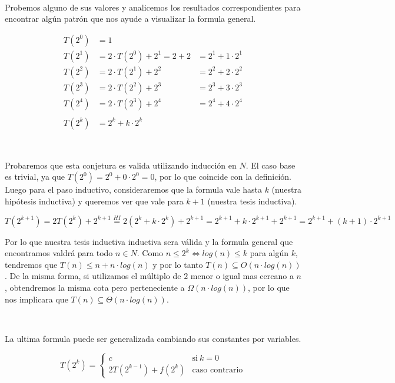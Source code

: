 \documentclass[10pt, a4paper]{report}
\begin{document}
~

Probemos alguno de sus valores y analicemos los resultados correspondientes para encontrar alg\'un patr\'on que nos ayude a visualizar la formula general.

\begin{equation*}
\begin{align*}
 T(2^0) & = 1 \\
 T(2^1) & = 2 \cdot T(2^0) + 2^1 = 2 + 2 & = 2^1 + 1 \cdot 2^1 \\
 T(2^2) & = 2 \cdot T(2^1) + 2^2 & = 2^2 + 2 \cdot 2^2 \\
 T(2^3) & = 2 \cdot T(2^2) + 2^3 &= 2^3 + 3 \cdot 2^3 \\
 T(2^4) & = 2 \cdot T(2^3) + 2^4 &= 2^4 + 4 \cdot 2^4 \\ \\
 T(2^k) & = 2^k + k \cdot 2^k
\end{align*}
\end{equation*}

~

Probaremos que esta conjetura es valida utilizando inducci\'on en $N$. El caso base es trivial, ya que $T(2^0) = 2^0 + 0 \cdot 2^0 = 0$, por lo que coincide con la definici\'on. Luego para el paso inductivo, consideraremos que la formula vale hasta $k$ (nuestra hip\'otesis inductiva) y queremos ver que vale para $k+1$ (nuestra tesis inductiva).

\begin{equation*}
 T(2^{k+1}) = 2T(2^k) + 2^{k+1} \overset{HI}{=} 2(2^k + k \cdot 2^k) + 2^{k+1} = 2^{k+1} + k \cdot 2^{k+1} + 2^{k+1} = 2^{k+1} + (k+1) \cdot 2^{k+1}
\end{equation*}

Por lo que nuestra tesis inductiva inductiva sera v\'alida y la formula general que encontramos valdr\'a para todo $n \in N$. Como $n \leq 2^k \iff log(n) \leq k$ para alg\'un $k$, tendremos que $T(n) \leq n + n \cdot log(n)$ y por lo tanto $T(n) \subseteq O(n \cdot log(n))$. De la misma forma, si utilizamos el m\'ultiplo de $2$ menor o igual mas cercano a $n$, obtendremos la misma cota pero perteneciente a $\Omega(n \cdot log(n))$, por lo que nos implicara que $T(n) \subseteq \Theta(n \cdot log(n))$. 

~

La ultima formula puede ser generalizada cambiando sus constantes por variables.

\begin{equation*}
  T(2^k) = \begin{cases}
	      c         		& \text{si} \ k = 0 \\
	      2T(2^{k-1}) + f(2^k)        	& \text{caso contrario}
	  \end{cases}
\end{equation*}
\end{document}
